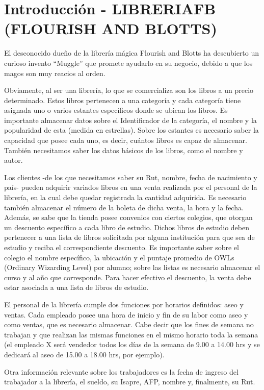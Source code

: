 \documentclass[letterpaper]{article}
\begin{document}
\section{Introducción - LIBRERIAFB (FLOURISH AND BLOTTS)}

El desconocido dueño de la librería mágica Flourish and Blotts ha descubierto un curioso invento “Muggle” que promete ayudarlo en su negocio, debido a que los magos son muy reacios al orden.

Obviamente, al ser una librería, lo que se comercializa son los libros a un precio determinado. Estos libros pertenecen a una categoría y cada categoría tiene asignada uno o varios estantes específicos donde se ubican los libros. Es importante almacenar datos sobre el Identificador de la categoría, el nombre y la popularidad de esta (medida en estrellas). Sobre los estantes es necesario saber la capacidad que posee cada uno, es decir, cuántos libros es capaz de almacenar. También necesitamos saber los datos básicos de los libros, como el nombre y autor.

Los clientes -de los que necesitamos saber su Rut, nombre, fecha de nacimiento y país- pueden adquirir variados libros en una venta realizada por el personal de la librería, en la cual debe quedar registrada la cantidad adquirida. Es necesario también almacenar el número de la boleta de dicha venta, la hora y la fecha. Además, se sabe que la tienda posee convenios con ciertos colegios, que otorgan un descuento específico a cada libro de estudio. Dichos libros de estudio deben pertenecer a una lista de libros solicitada por alguna institución para que sea de estudio y reciba el correspondiente descuento. Es importante saber sobre el colegio el nombre específico, la ubicación y el puntaje promedio de OWLs (Ordinary Wizarding Level) por alumno; sobre las listas es necesario almacenar el curso y al año que corresponde. Para hacer efectivo el descuento, la venta debe estar asociada a una lista de libros de estudio.

El personal de la librería cumple dos funciones por horarios definidos: aseo y ventas. Cada empleado posee una hora de inicio y fin de su labor como aseo y como ventas, que es necesario almacenar. Cabe decir que los fines de semana no trabajan y que realizan las mismas funciones en el mismo horario toda la semana (el empleado X será vendedor todos los días de la semana de 9.00 a 14.00 hrs y se dedicará al aseo de 15.00 a 18.00 hrs, por ejemplo).

Otra información relevante sobre los trabajadores es la fecha de ingreso del trabajador a la librería, el sueldo, su Isapre, AFP, nombre y, finalmente, su Rut.
\end{document}
